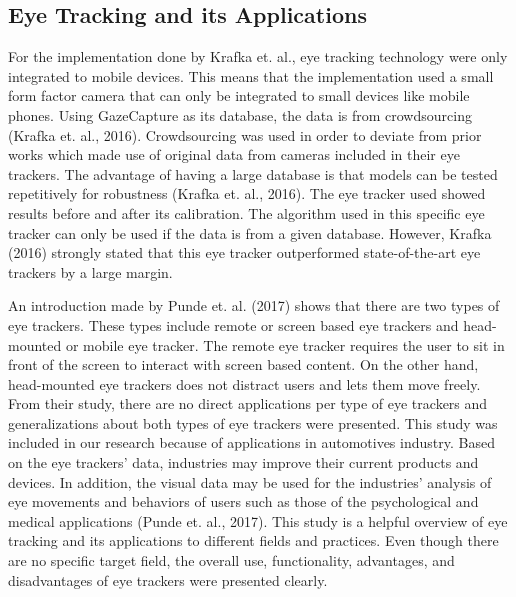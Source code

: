 \subsection{Eye Tracking and its Applications}
  For the implementation done by Krafka et. al., eye tracking technology were only integrated to mobile devices. This means that the implementation used a small form factor camera that can only be integrated to small devices like mobile phones. Using GazeCapture as its database, the data is from crowdsourcing (Krafka et. al., 2016). Crowdsourcing was used in order to deviate from prior works which made use of original data from cameras included in their eye trackers. The advantage of having a large database is that models can be tested repetitively for robustness (Krafka et. al., 2016). The eye tracker used  showed results before and after its calibration. The algorithm used in this specific eye tracker can only be used if the data is from a given database. However, Krafka (2016) strongly stated that this eye tracker outperformed state-of-the-art eye trackers by a large margin.
\newline

An introduction made by Punde et. al. (2017) shows that there are two types of eye trackers. These types include remote or screen based eye trackers and head-mounted or mobile eye tracker. The remote eye tracker requires the user to sit in front of the screen to interact with screen based content. On the other hand, head-mounted eye trackers does not distract users and lets them move freely. From their study, there are no direct applications per type of eye trackers and generalizations about both types of eye trackers were presented. This study was included in our research because of applications in automotives industry. Based on the eye trackers’ data, industries may improve their current products and devices. In addition, the visual data may be used for the industries’ analysis of eye movements and behaviors of users such as those of the psychological and medical applications (Punde et. al., 2017). This study is a helpful overview of eye tracking and its applications to different fields and practices. Even though there are no specific target field, the overall use, functionality, advantages, and disadvantages of eye trackers were presented clearly.
\newline

